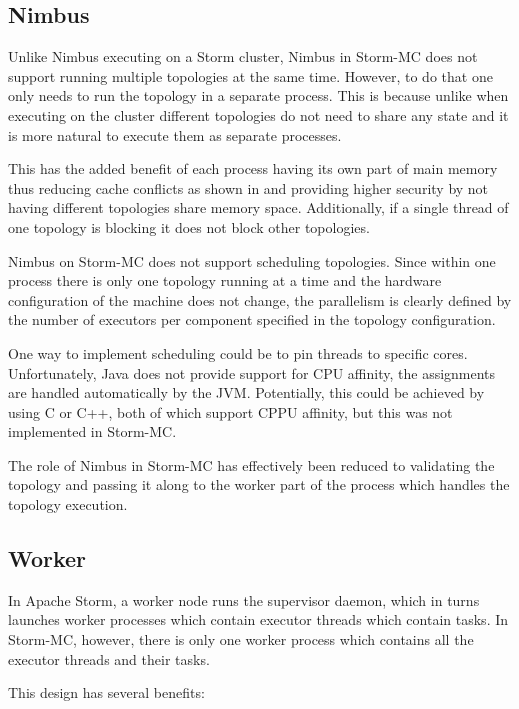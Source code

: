 \subsection{Nimbus}

Unlike Nimbus executing on a Storm cluster, Nimbus in Storm-MC does not support running multiple topologies at the same time. However, to do that one only needs to run the topology in a separate process. This is because unlike when executing on the cluster different topologies do not need to share any state and it is more natural to execute them as separate processes.

This has the added benefit of each process having its own part of main memory thus reducing cache conflicts as shown in \cite{Chandra:2005:PIC:1042442.1043432} and providing higher security by not having different topologies share memory space. Additionally, if a single thread of one topology is blocking it does not block other topologies.

Nimbus on Storm-MC does not support scheduling topologies. Since within one process there is only one topology running at a time and the hardware configuration of the machine does not change, the parallelism is clearly defined by the number of executors per component specified in the topology configuration.

One way to implement scheduling could be to pin threads to specific cores. Unfortunately, Java does not provide support for CPU affinity, the assignments are handled automatically by the JVM. Potentially, this could be achieved by using C or C++, both of which support CPPU affinity, but this was not implemented in Storm-MC.


The role of Nimbus in Storm-MC has effectively been reduced to validating the topology and passing it along to the worker part of the process which handles the topology execution.

\subsection{Worker}

In Apache Storm, a worker node runs the supervisor daemon, which in turns launches worker processes which contain executor threads which contain tasks. In Storm-MC, however, there is only one worker process which contains all the executor threads and their tasks.

This design has several benefits:

